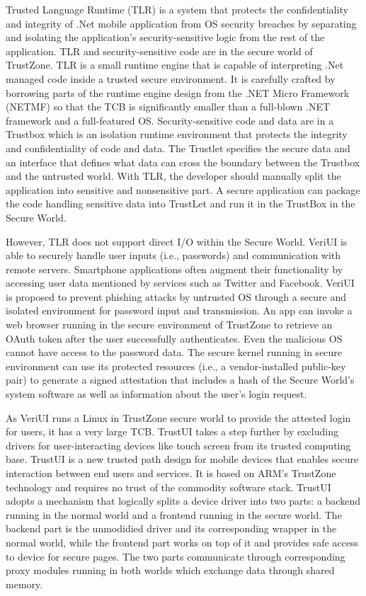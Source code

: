Trusted Language Runtime (TLR) \cite{TLR} is a system that protects the
confidentiality and integrity of .Net mobile application from OS security
breaches by separating and isolating the application's security-sensitive logic
from the rest of the application. TLR and security-sensitive code are in the
secure world of TrustZone. TLR is a small runtime engine that is capable of
interpreting .Net managed code inside a trusted secure environment. It is
carefully crafted by borrowing parts of the runtime engine design from the .NET
Micro Framework (NETMF) so that the TCB is significantly smaller than a
full-blown .NET framework and a full-featured OS. Security-sensitive code and
data are in a Trustbox which is an isolation runtime environment that protects
the integrity and confidentiality of code and data. The Trustlet specifies the
secure data and an interface that defines what data can cross the boundary
between the Trustbox and the untrusted world. With TLR, the developer should
manually split the application into sensitive and nonsensitive part.  A secure
application can package the code handling sensitive data into TrustLet and run
it in the TrustBox in the Secure World.

However, TLR does not support direct I/O within the Secure World. VeriUI
\cite{VeriUI} is able to securely handle user inputs (i.e., passwords) and
communication with remote servers. Smartphone applications often augment their
functionality by accessing user data mentioned by services such as Twitter and
Facebook. VeriUI is proposed to prevent phishing attacks by untrusted OS through
a secure and isolated environment for password input and transmission. An app
can invoke a web browser running in the secure environment of TrustZone to
retrieve an OAuth token after the user successfully authenticates. Even the
malicious OS cannot have access to the password data.  The secure kernel running
in secure environment can use its protected resources (i.e., a vendor-installed
public-key pair) to generate a signed attestation that includes a hash of the
Secure World's system software as well as information about the user's login
request.

As VeriUI runs a Linux in TrustZone secure world to provide the attested login
for users, it has a very large TCB. TrustUI \cite{TrustUI} takes a step further
by excluding drivers for user-interacting devices like touch screen from its
trusted computing base. TrustUI is a new trusted path design for mobile devices
that enables secure interaction between end users and services. It is based on
ARM's TrustZone technology and requires no trust of the commodity software
stack. TrustUI adopts a mechanism that logically splits a device driver into two
parts: a backend running in the normal world and a frontend running in the
secure world. The backend part is the unmodidied driver and its corresponding
wrapper in the normal world, while the frontend part works on top of it and
provides safe access to device for secure pages. The two parts communicate
through corresponding proxy modules running in both worlds which exchange data
through shared memory.


